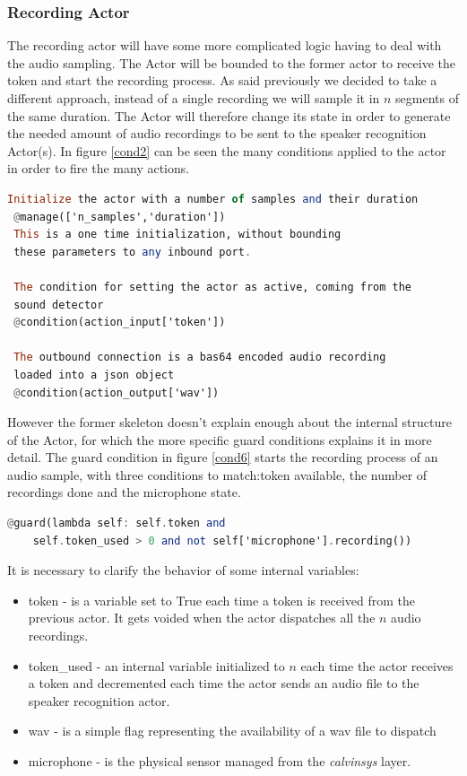  \subsubsection{Recording Actor}

 The recording actor will have some more complicated logic having to deal with
 the audio sampling. The Actor will be bounded to the former actor to receive
 the token and start the recording process. As said previously we decided to
 take a different approach, instead of a single recording we will sample it in
 $n$ segments of the same duration. The Actor will therefore change its state
 in order to generate the needed amount of audio recordings to be sent to the
 speaker recognition Actor(s).\newline
 In figure \ref{cond2} can be seen the many conditions applied to the actor in order to fire the many actions.

 \begin{lstlisting}[language=Haskell,frame=single,caption=Sound Actor conditions,label=cond2]
 Initialize the actor with a number of samples and their duration
 @manage(['n_samples','duration'])
 This is a one time initialization, without bounding
 these parameters to any inbound port.

 The condition for setting the actor as active, coming from the
 sound detector
 @condition(action_input['token'])

 The outbound connection is a bas64 encoded audio recording
 loaded into a json object
 @condition(action_output['wav'])
 \end{lstlisting}

 However the former skeleton doesn't explain enough about the internal structure of the Actor,
 for which the more specific guard conditions explains it in more detail.\newline
 The guard condition in figure \ref{cond6} starts the recording process of an audio sample,
 with three conditions to match:token available, the number of recordings done and the microphone state.
 \begin{lstlisting}[language=Haskell,frame=single,caption=Sound Actor conditions,label=cond6]
 @guard(lambda self: self.token and
    self.token_used > 0 and not self['microphone'].recording())
 \end{lstlisting}
\pagebreak
 It is necessary to clarify the behavior of some internal variables:

 \begin{itemize}
     \item token - is a variable set to True each time a token is received from the previous
     actor. It gets voided when the actor dispatches all the $n$ audio recordings.
     \item token\_used - an internal variable initialized to $n$ each time the actor receives
     a token and decremented each time the actor sends an audio file to the speaker recognition actor.
     \item wav - is a simple flag representing the availability of a wav file to dispatch
     \item microphone - is the physical sensor managed from the \textit{calvinsys} layer.
 \end{itemize}

